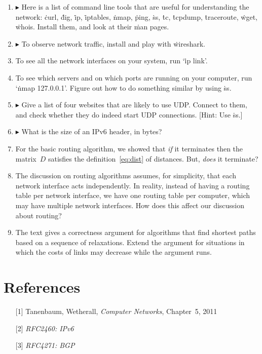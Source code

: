 \begin{enumerate}
\item
  $\blacktriangleright$
  Here is a list of command line tools that are useful for understanding the network:
  \.{curl},
  \.{dig},
  \.{ip},
  \.{iptables},
  \.{nmap},
  \.{ping},
  \.{ss},
  \.{tc},
  \.{tcpdump},
  \.{traceroute},
  \.{wget},
  \.{whois}.
  Install them, and look at their \.{man} pages.
\item
  $\blacktriangleright$
  To observe network traffic, install and play with \.{wireshark}.
\item
  To see all the network interfaces on your system,
    run `\.{ip link}'.
\item
  To see which servers and on which ports are running on your computer,
    run `\.{nmap 127.0.0.1}'.
  Figure out how to do something similar by using \.{ss}.
\item
  $\blacktriangleright$
  Give a list of four websites that are likely to use UDP\null.
  Connect to them, and check whether they do indeed start UDP connections.
  [Hint: Use \.{ss}.]
\item
  $\blacktriangleright$
  What is the size of an IPv6 header, in bytes?
\item
  For the basic routing algorithm,
    we showed that
      \emph{if} it terminates
      then the matrix~$D$ satisfies the definition~\eqref{eq:dist} of distances.
  But, \emph{does} it terminate?
\item
  The discussion on routing algorithms assumes, for simplicity,
    that each network interface acts independently.
  In reality,
    instead of having a routing table per network interface,
    we have one routing table per computer,
    which may have multiple network interfaces.
  How does this affect our discussion about routing?
\item
  The text gives a correctness argument for algorithms that find shortest paths
    based on a sequence of relaxations.
  Extend the argument for situations in which the costs of links may decrease
    while the argument runs.
\end{enumerate}

\section*{References}

\begin{itemize}
\item[{[1]}]
  Tanenbaum, Wetherall,
  \emph{Computer Networks}, Chapter~5,
  2011
\item[{[2]}]
  \emph{RFC2460: IPv6}
\item[{[3]}]
  \emph{RFC4271: BGP}
\end{itemize}




